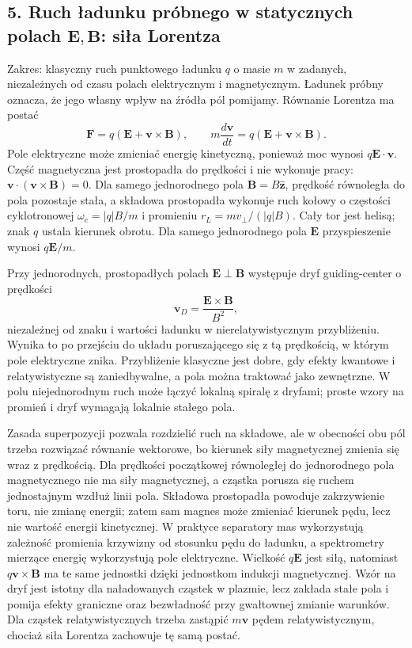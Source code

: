 \documentclass[11pt,a4paper]{article}
\begin{document}
\subsection{5. Ruch ładunku próbnego w statycznych polach \(\mathbf E,\mathbf B\): siła Lorentza}
Zakres: klasyczny ruch punktowego ładunku \(q\) o masie \(m\) w zadanych, niezależnych od czasu polach elektrycznym i magnetycznym. Ładunek próbny oznacza, że jego własny wpływ na źródła pól pomijamy. Równanie Lorentza ma postać
\[
\mathbf F=q(\mathbf E+\mathbf v\times\mathbf B),\qquad
m\frac{d\mathbf v}{dt}=q(\mathbf E+\mathbf v\times\mathbf B).
\]
Pole elektryczne może zmieniać energię kinetyczną, ponieważ moc wynosi \(q\mathbf E\cdot\mathbf v\). Część magnetyczna jest prostopadła do prędkości i nie wykonuje pracy: \(\mathbf v\cdot(\mathbf v\times\mathbf B)=0\). Dla samego jednorodnego pola \(\mathbf B=B\hat{\mathbf z}\), prędkość równoległa do pola pozostaje stała, a składowa prostopadła wykonuje ruch kołowy o częstości cyklotronowej \(\omega_c=|q|B/m\) i promieniu \(r_L=m v_\perp/(|q|B)\). Cały tor jest helisą; znak \(q\) ustala kierunek obrotu. Dla samego jednorodnego pola \(\mathbf E\) przyspieszenie wynosi \(q\mathbf E/m\).

Przy jednorodnych, prostopadłych polach \(\mathbf E\perp\mathbf B\) występuje dryf guiding-center o prędkości
\[
\mathbf v_D=\frac{\mathbf E\times\mathbf B}{B^2},
\]
niezależnej od znaku i wartości ładunku w nierelatywistycznym przybliżeniu. Wynika to po przejściu do układu poruszającego się z tą prędkością, w którym pole elektryczne znika. Przybliżenie klasyczne jest dobre, gdy efekty kwantowe i relatywistyczne są zaniedbywalne, a pola można traktować jako zewnętrzne. W polu niejednorodnym ruch może łączyć lokalną spiralę z dryfami; proste wzory na promień i dryf wymagają lokalnie stałego pola.

Zasada superpozycji pozwala rozdzielić ruch na składowe, ale w obecności obu pól trzeba rozwiązać równanie wektorowe, bo kierunek siły magnetycznej zmienia się wraz z prędkością. Dla prędkości początkowej równoległej do jednorodnego pola magnetycznego nie ma siły magnetycznej, a cząstka porusza się ruchem jednostajnym wzdłuż linii pola. Składowa prostopadła powoduje zakrzywienie toru, nie zmianę energii; zatem sam magnes może zmieniać kierunek pędu, lecz nie wartość energii kinetycznej. W praktyce separatory mas wykorzystują zależność promienia krzywizny od stosunku pędu do ładunku, a spektrometry mierzące energię wykorzystują pole elektryczne. Wielkość \(q\mathbf E\) jest siłą, natomiast \(q\mathbf v\times\mathbf B\) ma te same jednostki dzięki jednostkom indukcji magnetycznej. Wzór na dryf jest istotny dla naładowanych cząstek w plazmie, lecz zakłada stałe pola i pomija efekty graniczne oraz bezwładność przy gwałtownej zmianie warunków. Dla cząstek relatywistycznych trzeba zastąpić \(m\mathbf v\) pędem relatywistycznym, chociaż siła Lorentza zachowuje tę samą postać.
\end{document}
